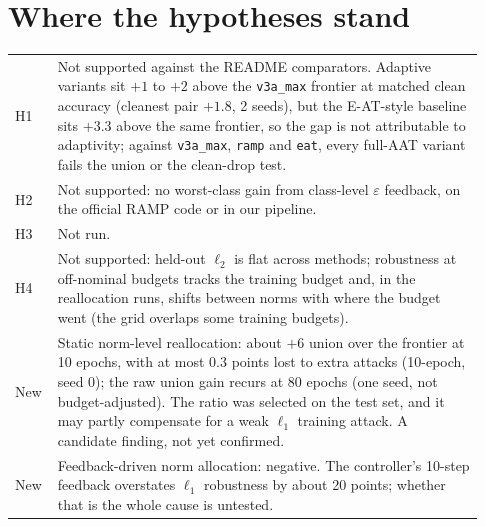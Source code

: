 \documentclass[11pt]{article}
\begin{document}
\section{Where the hypotheses stand}
\begin{table}[h]\centering\small
\begin{tabular}{p{0.07\linewidth}p{0.86\linewidth}}\toprule
H1 & Not supported against the README comparators. Adaptive variants sit $+1$ to $+2$ above the \texttt{v3a\_max} frontier at matched clean accuracy (cleanest pair $+1.8$, 2 seeds), but the E-AT-style baseline sits $+3.3$ above the same frontier, so the gap is not attributable to adaptivity; against \texttt{v3a\_max}, \texttt{ramp} and \texttt{eat}, every full-AAT variant fails the union or the clean-drop test.\\
H2 & Not supported: no worst-class gain from class-level $\varepsilon$ feedback, on the official RAMP code or in our pipeline.\\
H3 & Not run.\\
H4 & Not supported: held-out $\ell_2$ is flat across methods; robustness at off-nominal budgets tracks the training budget and, in the reallocation runs, shifts between norms with where the budget went (the grid overlaps some training budgets).\\
New & Static norm-level reallocation: about $+6$ union over the frontier at 10 epochs, with at most 0.3 points lost to extra attacks (10-epoch, seed 0); the raw union gain recurs at 80 epochs (one seed, not budget-adjusted). The ratio was selected on the test set, and it may partly compensate for a weak $\ell_1$ training attack. A candidate finding, not yet confirmed.\\
New & Feedback-driven norm allocation: negative. The controller's 10-step feedback overstates $\ell_1$ robustness by about 20 points; whether that is the whole cause is untested.\\\bottomrule
\end{tabular}
\end{table}
\end{document}
